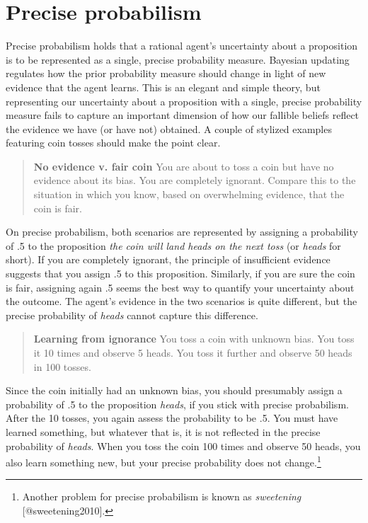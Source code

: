 \documentclass[
  letterpaper,
  DIV=11,
  numbers=noendperiod]{scrartcl}
\begin{document}
\section{Precise probabilism}\label{precise-probabilism}

\label{sec:precise-probabilism}

Precise probabilism holds that a rational agent's uncertainty about a
proposition is to be represented as a single, precise probability
measure. Bayesian updating regulates how the prior probability measure
should change in light of new evidence that the agent learns. This is an
elegant and simple theory, but representing our uncertainty about a
proposition with a single, precise probability measure fails to capture
an important dimension of how our fallible beliefs reflect the evidence
we have (or have not) obtained. A couple of stylized examples featuring
coin tosses should make the point clear.

\begin{quote}
\textbf{No evidence v. fair coin}
You are about to toss a coin but have no evidence 
about its bias. You are completely ignorant. 
Compare this to the situation in which you know, 
based on overwhelming evidence, that the coin is fair. 
\end{quote}

\noindent On precise probabilism, both scenarios are represented by
assigning a probability of .5 to the proposition
\emph{the coin will land heads on the next toss} (or \emph{heads} for
short). If you are completely ignorant, the principle of insufficient
evidence suggests that you assign .5 to this proposition. Similarly, if
you are sure the coin is fair, assigning again .5 seems the best way to
quantify your uncertainty about the outcome. The agent's evidence in the
two scenarios is quite different, but the precise probability of
\emph{heads} cannot capture this difference.

\begin{quote}
\textbf{Learning from ignorance}
You toss a coin with unknown bias. You toss it 10 times and observe 5 heads. You toss it further and observe 50 heads in 100 tosses. 
\end{quote}

\noindent Since the coin initially had an unknown bias, you should
presumably assign a probability of .5 to the proposition \emph{heads},
if you stick with precise probabilism. After the 10 tosses, you again
assess the probability to be .5. You must have learned something, but
whatever that is, it is not reflected in the precise probability of
\emph{heads}. When you toss the coin 100 times and observe 50 heads, you
also learn something new, but your precise probability does not
change.\footnote{Another problem for precise probabilism is known as
  \emph{sweetening} {[}@sweetening2010{]}.}
\end{document}
